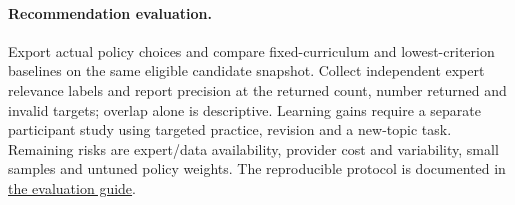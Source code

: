 \paragraph{Recommendation evaluation.}
Export actual policy choices and compare fixed-curriculum and
lowest-criterion baselines on the same eligible candidate snapshot.
Collect independent expert relevance labels and report precision at the
returned count, number returned and invalid targets; overlap alone is
descriptive. Learning gains require a separate participant study using
targeted practice, revision and a new-topic task. Remaining risks are
expert/data availability, provider cost and variability, small samples and
untuned policy weights. The reproducible protocol is documented in
\href{https://github.com/huyho44/IELTS-Evaluator-Pro/blob/dbbe536/docs/evaluation.md}{the evaluation guide}.
